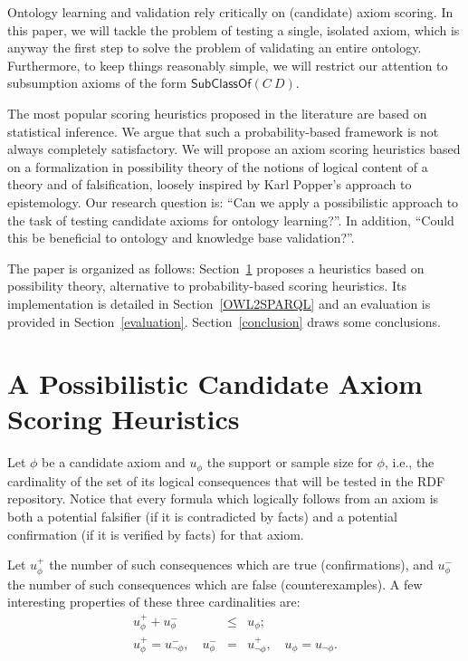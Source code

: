 \documentclass{llncs}
\begin{document}
Ontology learning and validation rely critically on (candidate) axiom scoring.
In this paper, we will tackle the problem of testing a single, isolated axiom,
which is anyway the first step to solve the problem of validating an entire ontology.
Furthermore, to keep things reasonably simple, we will restrict our attention
to subsumption axioms of the form $\mathsf{SubClassOf}(C\ D)$.

The most popular scoring heuristics proposed in the literature are based on statistical inference.
We argue that such a probability-based framework is not always completely satisfactory.
We will propose an axiom scoring heuristics based on a formalization in possibility theory of
the notions of logical content of a theory and of falsification, loosely inspired
by Karl Popper's approach to epistemology. Our research question is: ``Can we apply
a possibilistic approach to the task of testing candidate axioms for ontology learning?''.
In addition, ``Could this be beneficial to ontology and knowledge base validation?''.


The paper is organized as follows:
Section~\ref{possibility-theory} proposes a heuristics based
on possibility theory, alternative to probability-based scoring heuristics.
Its implementation is detailed in
Section~\ref{OWL2SPARQL} and an evaluation is provided in Section~\ref{evaluation}.
Section~\ref{conclusion} draws some conclusions.

\section{A Possibilistic Candidate Axiom Scoring Heuristics}
\label{possibility-theory}

Let $\phi$ be a candidate axiom and $u_\phi$ the support or sample size for $\phi$,
i.e., the cardinality of the set of its logical consequences that will be tested in the RDF repository.
Notice that every formula which logically follows from an axiom is both
a potential falsifier (if it is contradicted by facts)
and a potential confirmation (if it is verified by facts) for that axiom.

Let $u_\phi^+$ the number of such consequences which are true (confirmations), and
$u_\phi^-$ the number of such consequences which are false (counterexamples).
A few interesting properties of these three cardinalities are:
\begin{eqnarray}
  u_\phi^+ + u_\phi^- &\leq& u_\phi;\label{eq:conf-pls-expt-lt-refc} \\
  u_\phi^+ = u_{\neg\phi}^-, \quad
  u_\phi^- &=& u_{\neg\phi}^+, \quad
  u_\phi = u_{\neg\phi}.
\end{eqnarray}
\end{document}
